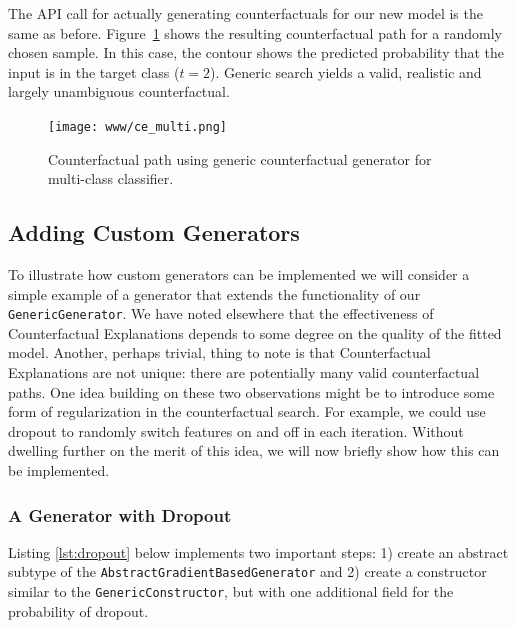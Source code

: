 \documentclass{juliacon}
\begin{document}
The API call for actually generating counterfactuals for our new model
is the same as before. Figure~\ref{fig-multi} shows the resulting
counterfactual path for a randomly chosen sample. In this case, the
contour shows the predicted probability that the input is in the target
class (\(t=2\)). Generic search yields a valid, realistic and largely
unambiguous counterfactual.

\begin{figure}

{\centering \texttt{[image: www/ce\_multi.png]}

}

\caption{\label{fig-multi}Counterfactual path using generic
counterfactual generator for multi-class classifier.}

\end{figure}

\hypertarget{sec-custom-gen}{%
\subsection{Adding Custom Generators}\label{sec-custom-gen}}

To illustrate how custom generators can be implemented we will consider
a simple example of a generator that extends the functionality of our
\texttt{GenericGenerator}. We have noted elsewhere that the
effectiveness of Counterfactual Explanations depends to some degree on
the quality of the fitted model. Another, perhaps trivial, thing to note
is that Counterfactual Explanations are not unique: there are
potentially many valid counterfactual paths. One idea building on these
two observations might be to introduce some form of regularization in
the counterfactual search. For example, we could use dropout to randomly
switch features on and off in each iteration. Without dwelling further
on the merit of this idea, we will now briefly show how this can be
implemented.

\hypertarget{a-generator-with-dropout}{%
\subsubsection{A Generator with
Dropout}\label{a-generator-with-dropout}}

Listing \ref{lst:dropout} below implements two important steps: 1)
create an abstract subtype of the
\texttt{AbstractGradientBasedGenerator} and 2) create a constructor
similar to the \texttt{GenericConstructor}, but with one additional
field for the probability of dropout.
\end{document}
